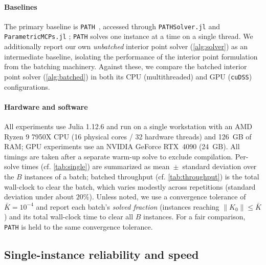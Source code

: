 \documentclass[conference]{IEEEtran}
\begin{document}
\paragraph{Baselines}
The primary baseline is \texttt{PATH}~\cite{dirkse1995path}, accessed through
\texttt{PATHSolver.jl} \cite{PATHSolver} and \texttt{ParametricMCPs.jl} \cite{ParametricMCPs}; \texttt{PATH} solves one instance
at a time on a single thread. We additionally report our own \emph{unbatched}
interior point solver (\cref{alg:solver}) as an intermediate baseline, isolating
the performance of the interior point formulation from the batching machinery. Against these, we
compare the batched interior point solver (\cref{alg:batched}) in both its CPU
(multithreaded) and GPU (\texttt{cuDSS}) configurations.

\paragraph{Hardware and software}
All experiments use Julia 1.12.6 and run on a single workstation with an AMD Ryzen 9 7950X CPU (16 physical
cores / 32 hardware threads) and 126~GB of RAM; GPU experiments use an NVIDIA GeForce
RTX~4090 (24~GB). All timings are taken after a
separate warm-up solve to exclude compilation. Per-solve times (cf.  \cref{tab:single}) are
summarized as mean~$\pm$~standard deviation over the $B$ instances of a batch; batched
throughput (cf. \cref{tab:throughput}) is the total wall-clock to clear the batch, which varies
modestly across repetitions (standard deviation under about $20\%$). Unless noted, we use a
convergence tolerance of $\bar K = 10^{-4}$ and report each batch's \emph{solved fraction}
(instances reaching $\|K_0\| \le \bar K$) and its total wall-clock time to clear all $B$
instances. For a fair comparison, \texttt{PATH} is held to the same convergence tolerance.

\subsection{Single-instance reliability and speed}
\label{sec:exp:single}
\end{document}
